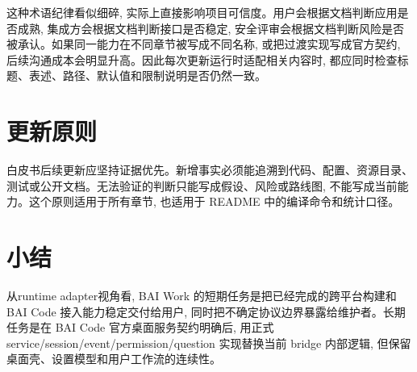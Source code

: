 这种术语纪律看似细碎, 实际上直接影响项目可信度。用户会根据文档判断应用是否成熟, 集成方会根据文档判断接口是否稳定, 安全评审会根据文档判断风险是否被承认。如果同一能力在不同章节被写成不同名称, 或把过渡实现写成官方契约, 后续沟通成本会明显升高。因此每次更新运行时适配相关内容时, 都应同时检查标题、表述、路径、默认值和限制说明是否仍然一致。

\section{更新原则}
白皮书后续更新应坚持证据优先。新增事实必须能追溯到代码、配置、资源目录、测试或公开文档。无法验证的判断只能写成假设、风险或路线图, 不能写成当前能力。这个原则适用于所有章节, 也适用于 README 中的编译命令和统计口径。

\section{小结}
从runtime adapter视角看, BAI Work 的短期任务是把已经完成的跨平台构建和 BAI Code 接入能力稳定交付给用户, 同时把不确定协议边界暴露给维护者。长期任务是在 BAI Code 官方桌面服务契约明确后, 用正式 service/session/event/permission/question 实现替换当前 bridge 内部逻辑, 但保留桌面壳、设置模型和用户工作流的连续性。
